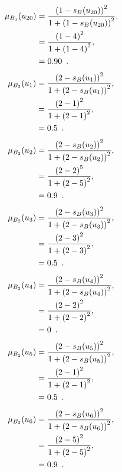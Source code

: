 \documentclass[a4paper,openany]{book}
\begin{document}
				\begin{align}
					\mu_{B_1}(u_{20}) &= \frac{\left(1-s_B(u_{20})\right)^2}{1 + \left(1-s_B(u_{20})\right)^2} ,\\
					&= \frac{\left(1-4\right)^2}{1 + \left(1-4\right)^2} \notag ,\\
					&= 0.90 \enspace. \notag
				\end{align}
				\begin{align}
					\mu_{B_2}(u_1) &= \frac{\left(2-s_B(u_1)\right)^2}{1 + \left(2-s_B(u_1)\right)^2} ,\\
					&= \frac{\left(2-1\right)^2}{1 + \left(2-1\right)^2} \notag ,\\
					&= 0.5 \enspace. \notag
				\end{align}
				\begin{align}
					\mu_{B_2}(u_2) &= \frac{\left(2-s_B(u_2)\right)^2}{1 + \left(2-s_B(u_2)\right)^2} ,\\
					&= \frac{\left(2-2\right)^5}{1 + \left(2-5\right)^2} \notag ,\\
					&= 0.9 \enspace. \notag
				\end{align}
				\begin{align}
					\mu_{B_2}(u_3) &= \frac{\left(2-s_B(u_3)\right)^2}{1 + \left(2-s_B(u_3)\right)^2} ,\\
					&= \frac{\left(2-3\right)^2}{1 + \left(2-3\right)^2} \notag ,\\
					&= 0.5 \enspace. \notag
				\end{align}
				\begin{align}
					\mu_{B_2}(u_4) &= \frac{\left(2-s_B(u_4)\right)^2}{1 + \left(2-s_B(u_4)\right)^2} ,\\
					&= \frac{\left(2-2\right)^2}{1 + \left(2-2\right)^2} \notag ,\\
					&= 0 \enspace. \notag
				\end{align}
				\begin{align}
					\mu_{B_2}(u_5) &= \frac{\left(2-s_B(u_5)\right)^2}{1 + \left(2-s_B(u_5)\right)^2} ,\\
					&= \frac{\left(2-1\right)^2}{1 + \left(2-1\right)^2} \notag ,\\
					&= 0.5 \enspace. \notag
				\end{align}
				\begin{align}
					\mu_{B_2}(u_6) &= \frac{\left(2-s_B(u_6)\right)^2}{1 + \left(2-s_B(u_6)\right)^2} ,\\
					&= \frac{\left(2-5\right)^2}{1 + \left(2-5\right)^2} \notag ,\\
					&= 0.9 \enspace. \notag
				\end{align}
\end{document}
